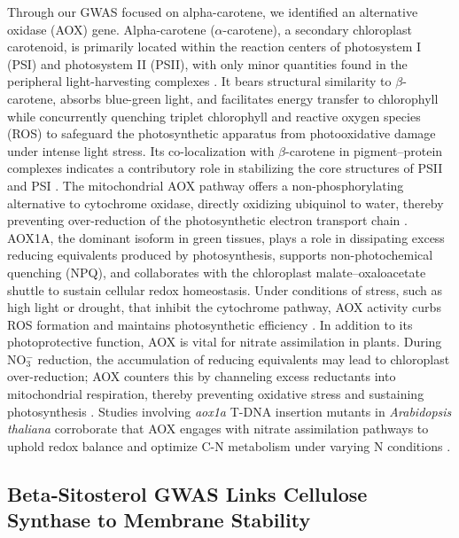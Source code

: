 \documentclass[10pt,letterpaper]{article}
\begin{document}
Through our GWAS focused on alpha-carotene, we  identified an alternative oxidase (AOX) gene. Alpha-carotene (\(\alpha\)-carotene), a secondary chloroplast carotenoid, is primarily located within the reaction centers of photosystem I (PSI) and photosystem II (PSII), with only minor quantities found in the peripheral light-harvesting complexes \citep{Young1989}. It bears structural similarity to \(\beta\)-carotene, absorbs blue-green light, and facilitates energy transfer to chlorophyll while concurrently quenching triplet chlorophyll and reactive oxygen species (ROS) to safeguard the photosynthetic apparatus from photooxidative damage under intense light stress. Its co-localization with \(\beta\)-carotene in pigment–protein complexes indicates a contributory role in stabilizing the core structures of PSII and PSI \citep{Young1989}. The mitochondrial AOX pathway offers a non-phosphorylating alternative to cytochrome oxidase, directly oxidizing ubiquinol to water, thereby preventing over-reduction of the photosynthetic electron transport chain \citep{Vishwakarma2015}. AOX1A, the dominant isoform in green tissues, plays a role in dissipating excess reducing equivalents produced by photosynthesis, supports non-photochemical quenching (NPQ), and collaborates with the chloroplast malate–oxaloacetate shuttle to sustain cellular redox homeostasis. Under conditions of stress, such as high light or drought, that inhibit the cytochrome pathway, AOX activity curbs ROS formation and maintains photosynthetic efficiency \citep{Vishwakarma2015}. In addition to its photoprotective function, AOX is vital for nitrate assimilation in plants. During NO\(_3^-\) reduction, the accumulation of reducing equivalents may lead to chloroplast over-reduction; AOX counters this by channeling excess reductants into mitochondrial respiration, thereby preventing oxidative stress and sustaining photosynthesis \citep{Gandin2014}. Studies involving \emph{aox1a} T-DNA insertion mutants in \emph{Arabidopsis thaliana} corroborate that AOX engages with nitrate assimilation pathways to uphold redox balance and optimize C-N metabolism under varying N conditions \citep{Gandin2014,Vishwakarma2015}.


\subsection*{Beta‑Sitosterol GWAS Links Cellulose Synthase to Membrane Stability}
\end{document}
